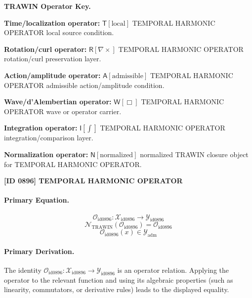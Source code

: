 \par\vspace{0.45\baselineskip}
\noindent\begin{minipage}[t]{\linewidth}
\begingroup
\small
\raggedright
\textbf{TRAWIN Operator Key.}\par
\noindent\textbf{Time/localization operator:} $\mathsf{T}\!\left[\mathrm{local}\right]$ TEMPORAL HARMONIC OPERATOR local source condition.\par
\noindent\textbf{Rotation/curl operator:} $\mathsf{R}\!\left[\nabla\times\right]$ TEMPORAL HARMONIC OPERATOR rotation/curl preservation layer.\par
\noindent\textbf{Action/amplitude operator:} $\mathsf{A}\!\left[\mathrm{admissible}\right]$ TEMPORAL HARMONIC OPERATOR admissible action/amplitude condition.\par
\noindent\textbf{Wave/d'Alembertian operator:} $\mathsf{W}\!\left[\Box\right]$ TEMPORAL HARMONIC OPERATOR wave or operator carrier.\par
\noindent\textbf{Integration operator:} $\mathsf{I}\!\left[\int\right]$ TEMPORAL HARMONIC OPERATOR integration/comparison layer.\par
\noindent\textbf{Normalization operator:} $\mathsf{N}\!\left[\mathrm{normalized}\right]$ normalized TRAWIN closure object for TEMPORAL HARMONIC OPERATOR.\par
\endgroup
\end{minipage}

\clearpage
\noindent\textbf{[ID 0896] TEMPORAL HARMONIC OPERATOR}\par
\vspace{0.35em}
\paragraph{Primary Equation.}
\[
\mathcal{O}_{\mathrm{id0896}}:\mathcal{X}_{\mathrm{id0896}}\longrightarrow\mathcal{Y}_{\mathrm{id0896}}
\]
\[
\mathcal{N}_{\mathrm{TRAWIN}}(\mathcal{O}_{\mathrm{id0896}})=\mathcal{O}_{\mathrm{id0896}}
\]
\[
\mathcal{O}_{\mathrm{id0896}}(x)\in\mathcal{Y}_{\mathrm{adm}}
\]

\paragraph{Primary Derivation.}
The identity \( \mathcal{O}_{\mathrm{id0896}}:\mathcal{X}_{\mathrm{id0896}}\longrightarrow\mathcal{Y}_{\mathrm{id0896}} \) is an operator relation. Applying the operator to the relevant function and using its algebraic properties (such as linearity, commutators, or derivative rules) leads to the displayed equality.

